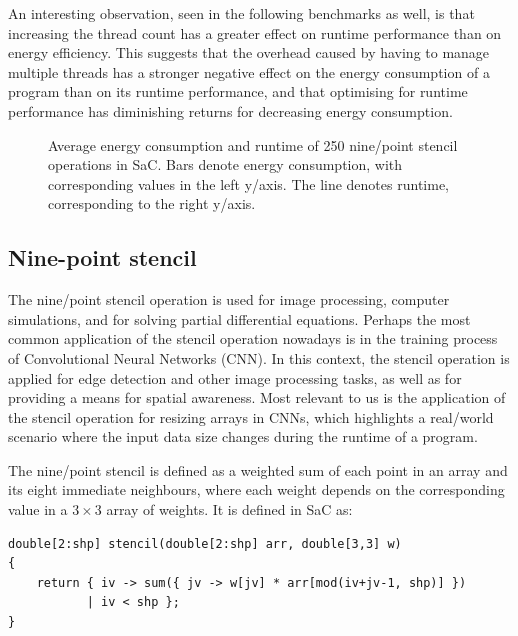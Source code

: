 An interesting observation, seen in the following benchmarks as well, is that increasing the thread count has a greater effect on runtime performance than on energy efficiency.
This suggests that the overhead caused by having to manage multiple threads has a stronger negative effect on the energy consumption of a program than on its runtime performance, and that optimising for runtime performance has diminishing returns for decreasing energy consumption.

\begin{figure}[ht]
  \scriptsize
  \begin{subfigure}{0.33\linewidth}
    \centering
  \end{subfigure}%
  \hfill
  \begin{subfigure}{0.33\linewidth}
    \centering
  \end{subfigure}%
  \hfill
  \begin{subfigure}{0.33\linewidth}
    \centering
  \end{subfigure}%
  \caption{Average energy consumption and runtime of \num{250} nine\-/point stencil operations in SaC.
  Bars denote energy consumption, with corresponding values in the left y\-/axis.
  The line denotes runtime, corresponding to the right y\-/axis.}%
  \label{fig:stencil}
\end{figure}

\subsection{Nine-point stencil}\label{sec:stencil}
The nine\-/point stencil operation is used for image processing, computer simulations, and for solving partial differential equations.
Perhaps the most common application of the stencil operation nowadays is in the training process of Convolutional Neural Networks (CNN).
In this context, the stencil operation is applied for edge detection and other image processing tasks, as well as for providing a means for spatial awareness.
Most relevant to us is the application of the stencil operation for resizing arrays in CNNs, which highlights a real\-/world scenario where the input data size changes during the runtime of a program.

The nine\-/point stencil is defined as a weighted sum of each point in an array and its eight immediate neighbours, where each weight depends on the corresponding value in a $3 \times 3$ array of weights.
It is defined in SaC as:
\begin{verbatim}
double[2:shp] stencil(double[2:shp] arr, double[3,3] w)
{
    return { iv -> sum({ jv -> w[jv] * arr[mod(iv+jv-1, shp)] })
           | iv < shp };
}
\end{verbatim}

